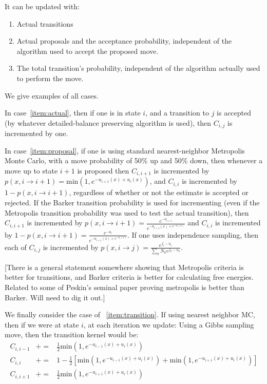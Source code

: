 \documentclass[superscriptaddress,showkeys, nofootinbib, pre, aps]{revtex4-1}
\begin{document}
It can be updated with: 
\begin{enumerate}
\item Actual transitions \label{item:actual}
\item Actual proposals and the acceptance probability, independent of the algorithm used to accept the proposed move.\label{item:proposal}
\item The total transition's probability, independent of the algorithm actually used to perform the move. \label{item:transition}
\end{enumerate}

We give examples of all cases.
 
In case~\ref{item:actual}, then if one is in state $i$, and a transition to $j$ is accepted (by whatever detailed-balance preserving algorithm is used), then $C_{i,j}$ is incremented by one.

In case~\ref{item:proposal}, if one is using standard nearest-neighbor Metropolis Monte Carlo, with a move probability of 50\% up and 50\% down, then whenever a move up to state $i+1$ is proposed then
$C_{i,i+1}$ is incremented by $p(x,i \rightarrow i+1) =
\mathrm{min}(1,e^{-u_{i+1}(x)+u_i(x)})$, and $C_{i,i}$ is incremented by $1-p(x,i \rightarrow i+1)$, regardless of whether or not the
estimate is accepted or rejected.  If the Barker transition
probability is used for incrementing (even if the Metropolis transition probability was used to test the actual transition), then
$C_{i,i+1}$ is incremented by $p(x,i\rightarrow i+1) =
\frac{e^{-u_{i+1}}}{e^{-u_{i+1}(x) + e^{-u_i(x)}}}$ and $C_{i,i}$ is
incremented by $1-p(x,i\rightarrow i+1) =
\frac{e^{-u_{i}}}{e^{-u_{i+1}(x) + e^{-u_i(x)}}}$.  If one uses
independence sampling, then each of $C_{i,j}$ is incremented by
$p(x,i \rightarrow j) = \frac{e^{f_i-u_i}}{\sum_k N_k e^{f_k-u_k}}$.

[There is a general statement somewhere showing that Metropolis
  criteria is better for transitions, and Barker criteria is better
  for calculating free energies.  Related to some of Peskin's seminal
  paper proving metropolis is better than Barker. Will need to dig it out.]

We finally consider the case of ~\ref{item:transition}. If using nearest neighbor MC, then if we were at state $i$, at each iteration we update:
Using a Gibbs sampling move, then the transition kernel would be:
\begin{eqnarray}
C_{i,i-1} &+=& \frac{1}{2}\mathrm{min}(1,e^{-u_{i-1}(x)+u_i(x)})\\ 
C_{i,i} &+=& 1 - \frac{1}{2}\left[\mathrm{min}(1,e^{-u_{i-1}(x)+u_i(x)}) + \mathrm{min}(1,e^{-u_{i+1}(x)+u_i(x)})\right]\\ 
C_{i,i+1} &+=& \frac{1}{2}\mathrm{min}(1,e^{-u_{i+1}(x)+u_i(x)})
\end{eqnarray}
\end{document}
